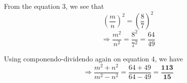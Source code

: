 \documentclass[12pt, journal, twocolumn]{IEEEtran}
\begin{document}
From the equation 3, we see that
\begin{equation*}
\left(\frac{m}{n}\right)^2 = \left(\frac{8}{7}\right)^2
\end{equation*}
\begin{equation}
\Rightarrow \frac{m^2}{n^2} = \frac{8^2}{7^2} = \frac{64}{49}
\end{equation}
\vspace{3mm}

Using componendo-dividendo again on equation 4, we have
\begin{equation}
\Rightarrow \frac{m^2 + n^2}{m^2 - n^2} = \frac{64 + 49}{64 - 49} = \frac{\textbf{113}}{\textbf{15}}
\end{equation}
\end{document}
